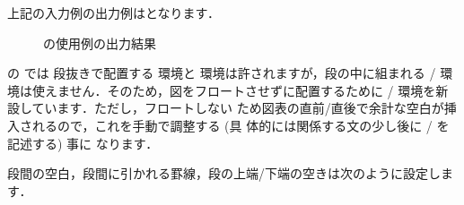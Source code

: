 上記の入力例の出力例はとなります．

\begin{figure}[htbp]
   \IOmargin
   \IOlabel
   \caption{の使用例の出力結果}%
\end{figure}

の  では 段抜きで配置する 
環境と  環境は許されますが，段の中に組まれる /
環境は使えません．そのため，図をフロートさせずに配置するために
/ 環境を新設しています．ただし，フロートしない
ため図表の直前/直後で余計な空白が挿入されるので，これを手動で調整する (具
体的には関係する文の少し後に / を記述する) 事に
なります．

段間の空白，段間に引かれる罫線，段の上端/下端の空きは次のように設定しま
す． 

